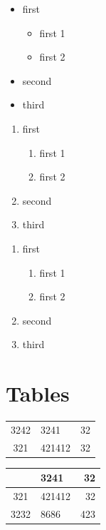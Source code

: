 \documentclass{book}
\begin{document}
\begin{itemize}
\item first 
\begin{itemize}
\item first 1
\item first 2
\end{itemize}
\item second
\item third
\end{itemize}

\begin{enumerate}
\item first 
\begin{enumerate}
\item first 1
\item first 2
\end{enumerate}
\item second
\item third
\end{enumerate}

\begin{enumerate}[\bfseries A] %
\item first 
\begin{enumerate}[\sffamily a.] %
\item first 1
\item first 2
\end{enumerate}
\item second
\item third
\end{enumerate}

\section{Tables}

\begin{flushright}
\begin{tabular}{|c|l|r|}
3242&3241&32\\
321&421412&32\\
\end{tabular}
\end{flushright}

\begin{center}
\begin{tabular}{clr}
\hline 
\vline
3242&3241&32\\
\hline
321&421412&32\\
\cline{2-3}
3232&8686&423\\
\hline 
\end{tabular}
\end{center}
\end{document}
